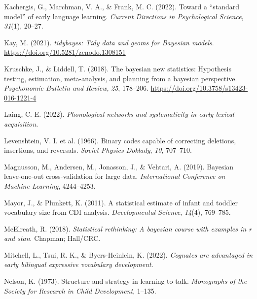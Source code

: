 \documentclass[
  letterpaper,
  DIV=11,
  numbers=noendperiod]{scrartcl}
\newlength{\cslhangindent}
\newlength{\cslentryspacingunit} %
\newenvironment{CSLReferences}[2] %
 {%
  \setlength{\parindent}{0pt}
  \ifodd #1
  \let\oldpar\par
  \def\par{\hangindent=\cslhangindent\oldpar}
  \fi
  \setlength{\parskip}{#2\cslentryspacingunit}
 }%
 {}
\begin{document}
\begin{CSLReferences}{1}{0}
\leavevmode{}%
Kachergis, G., Marchman, V. A., \& Frank, M. C. (2022). Toward a
{``standard model''} of early language learning. \emph{Current
Directions in Psychological Science}, \emph{31}(1), 20--27.

\leavevmode{}%
Kay, M. (2021). \emph{{tidybayes}: Tidy data and geoms for {Bayesian}
models}. \url{https://doi.org/10.5281/zenodo.1308151}

\leavevmode{}%
Kruschke, J., \& Liddell, T. (2018). The bayesian new statistics:
Hypothesis testing, estimation, meta-analysis, and planning from a
bayesian perspective. \emph{Psychonomic Bulletin and Review}, \emph{25},
178--206. \url{https://doi.org/10.3758/s13423-016-1221-4}

\leavevmode{}%
Laing, C. E. (2022). \emph{Phonological networks and systematicity in
early lexical acquisition}.

\leavevmode{}%
Levenshtein, V. I. et al. (1966). Binary codes capable of correcting
deletions, insertions, and reversals. \emph{Soviet Physics Doklady},
\emph{10}, 707--710.

\leavevmode{}%
Magnusson, M., Andersen, M., Jonasson, J., \& Vehtari, A. (2019).
Bayesian leave-one-out cross-validation for large data.
\emph{International Conference on Machine Learning}, 4244--4253.

\leavevmode{}%
Mayor, J., \& Plunkett, K. (2011). A statistical estimate of infant and
toddler vocabulary size from CDI analysis. \emph{Developmental Science},
\emph{14}(4), 769--785.

\leavevmode{}%
McElreath, R. (2018). \emph{Statistical rethinking: A bayesian course
with examples in r and stan}. Chapman; Hall/CRC.

\leavevmode{}%
Mitchell, L., Tsui, R. K., \& Byers-Heinlein, K. (2022). \emph{Cognates
are advantaged in early bilingual expressive vocabulary development}.

\leavevmode{}%
Nelson, K. (1973). Structure and strategy in learning to talk.
\emph{Monographs of the Society for Research in Child Development},
1--135.


\end{CSLReferences}
\end{document}
